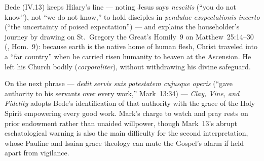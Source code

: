 Bede (IV.13) keeps Hilary's line --- noting Jesus says \emph{nescitis} (``you do not know''), not ``we do not know,'' to hold disciples in \emph{pendulae exspectationis incerto} (``the uncertainty of poised expectation'') --- and explains the householder's journey by drawing on St.~Gregory the Great's Homily~9 on Matthew~25:14--30 (, Hom.~9): because earth is the native home of human flesh, Christ traveled into a ``far country'' when he carried risen humanity to heaven at the Ascension. He left his Church bodily (\emph{corporaliter}), without withdrawing his divine safeguard.

On the next phrase --- \emph{dedit servis suis potestatem cujusque operis} (``gave authority to his servants over every work,'' Mark~13:34) --- \emph{Clay, Vine, and Fidelity} adopts Bede's identification of that authority with the grace of the Holy Spirit empowering every good work. Mark's charge to watch and pray rests on prior endowment rather than unaided willpower, though Mark~13's abrupt eschatological warning is also the main difficulty for the second interpretation, whose Pauline and Isaian grace theology can mute the Gospel's alarm if held apart from vigilance.

